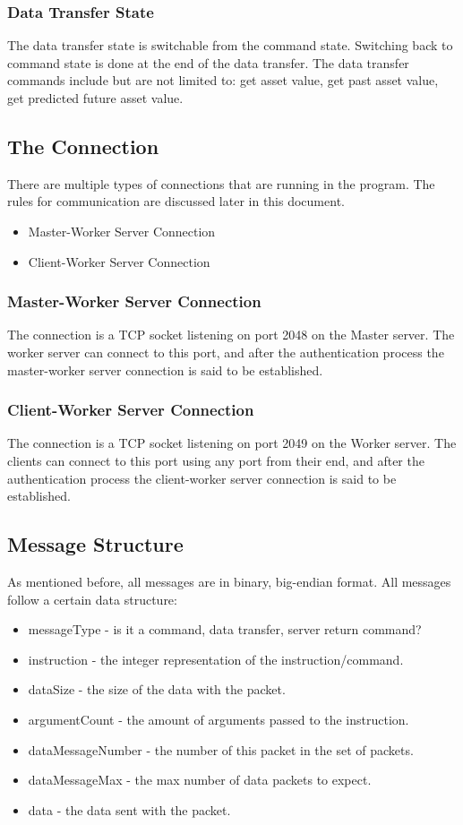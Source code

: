 \documentclass[a4paper]{article}
\begin{document}
\subsubsection{Data Transfer State}
The data transfer state is switchable from the command state. Switching back to
command state is done at the end of the data transfer. The data transfer
commands include but are not limited to: get asset value, get past asset value,
get predicted future asset value.

\subsection{The Connection}
There are multiple types of connections that are running in the program. The
rules for communication are discussed later in this document.
\begin{itemize}
	\item Master-Worker Server Connection
	\item Client-Worker Server Connection
\end{itemize}

\subsubsection{Master-Worker Server Connection}
The connection is a TCP socket listening on port 2048 on the Master server. The
worker server can connect to this port, and after the authentication process
the master-worker server connection is said to be established.

\subsubsection{Client-Worker Server Connection}
The connection is a TCP socket listening on port 2049 on the Worker server. The
clients can connect to this port using any port from their end, and after the
authentication process the client-worker server connection is said to be 
established.

\subsection{Message Structure}
As mentioned before, all messages are in binary, big-endian format. All
messages follow a certain data structure:
\begin{itemize}
	\item messageType - is it a command, data transfer, server return command?
	\item instruction - the integer representation of the instruction/command.
	\item dataSize - the size of the data with the packet.
	\item argumentCount - the amount of arguments passed to the instruction.
	\item dataMessageNumber - the number of this packet in the set of packets.
	\item dataMessageMax - the max number of data packets to expect.
	\item data - the data sent with the packet.
\end{itemize}
\end{document}
